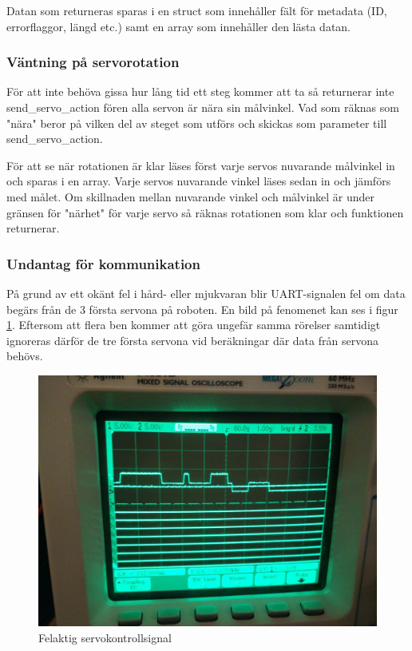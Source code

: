 \documentclass[a4paper,titlepage,12pt]{article}
\begin{document}
	Datan som returneras sparas i en struct som innehåller fält för metadata 
	(ID, errorflaggor, längd etc.) samt en array som innehåller den lästa datan.
	
	\subsubsection{Väntning på servorotation}
	För att inte behöva gissa hur lång tid ett steg kommer att ta så returnerar inte
	send\_servo\_action fören alla servon är nära sin målvinkel. Vad som räknas som "nära"
	beror på vilken del av steget som utförs och skickas som parameter till 
	send\_servo\_action.

	För att se när rotationen är klar läses först varje servos nuvarande målvinkel in och
	sparas i en array. Varje servos nuvarande vinkel läses sedan in och jämförs med målet.
	Om skillnaden mellan nuvarande vinkel och målvinkel är under gränsen för "närhet" för
	varje servo så räknas rotationen som klar och funktionen returnerar.

	\subsubsection{Undantag för kommunikation}
	På grund av ett okänt fel i hård- eller mjukvaran blir UART-signalen fel om data 
	begärs från de 3 första servona på roboten. En bild på fenomenet kan ses i figur 
	\ref{fig:servo_tri_state_bug}. Eftersom att flera ben kommer att göra ungefär samma 
	rörelser samtidigt ignoreras därför de tre första servona vid beräkningar där data
	från servona behövs.

	\begin{figure}[htpb]
		\centering
		\includegraphics[width=0.8\linewidth]{images/uart_tri_state.jpg}
		\caption{Felaktig servokontrollsignal}
		\label{fig:servo_tri_state_bug}
	\end{figure}
\end{document}
